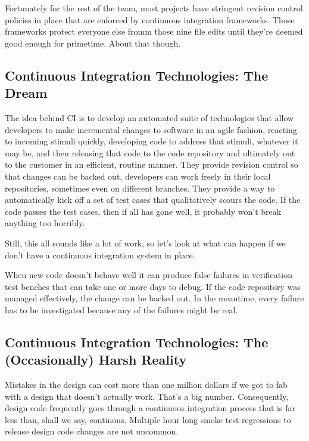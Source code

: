 \documentclass[twocolumn,letterpaper]{IEEEAerospaceCLS}  %
\begin{document}
Fortunately for the rest of the team, most projects have stringent revision control policies in place that are enforced by continuous integration frameworks. Those frameworks protect everyone else fromm those nine file edits until they're deemed good enough for primetime. About that though.

\subsection{Continuous Integration Technologies: The Dream}
The idea behind CI is to develop an automated suite of technologies that allow developers to make incremental changes to software in an agile fashion, reacting to incoming stimuli quickly, developing code to address  that stimuli, whatever it may be, and then releasing that code to the code repository and ultimately out to the customer in an efficient, routine manner.  They provide revision control so that changes can be backed out, developers can work freely in their local repositories, sometimes even on different branches. They provide a way to automatically kick off a set of test cases that qualitatively scours the code. If the code passes the test cases, then if all has gone well, it probably won't break anything too horribly.

Still, this all sounds like a lot of work, so let's look at what can happen if we don't have a continuous integration system in place.

When new code doesn't behave well it can produce false failures in verification test benches that can take one or more days to debug. If the code repository was managed effectively, the change can be backed out. In the meantime, every failure has to be investigated because any of the failures might be real.

\subsection{Continuous Integration Technologies: The (Occasionally) Harsh Reality}
Mistakes in the design can cost more than one million dollars if we got to fab with a design that doesn't actually work. That's a big number. Consequently, design code frequently goes through a continuous integration process that is far less than, shall we say, continous. Multiple hour long  smoke test regressions to release design code changes are not uncommon.
\end{document}

